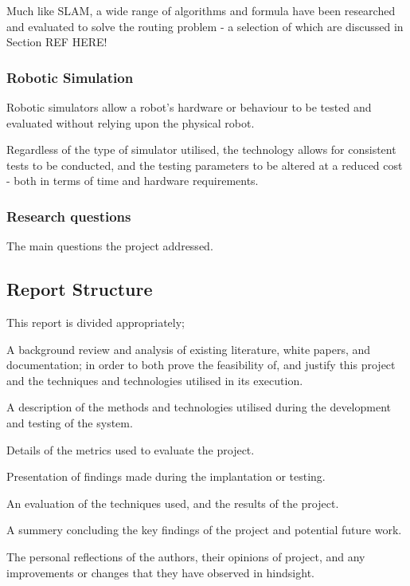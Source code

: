 Much like SLAM, a wide range of algorithms and formula have been researched
and evaluated to solve the routing problem - a selection of which are
discussed in Section REF HERE!


\subsubsection{Robotic Simulation}
Robotic simulators allow a robot's hardware or behaviour to be tested and
evaluated without relying upon the physical robot.

Regardless of the type of simulator utilised, the technology allows for
consistent tests to be conducted, and the testing parameters to be altered at
a reduced cost - both in terms of time and hardware requirements.


\subsubsection{Research questions}
The main questions the project addressed.


\subsection{Report Structure}
This report is divided appropriately;

A background review and analysis of existing literature, white papers, and
documentation; in order to both prove the feasibility of, and justify this
project and the techniques and technologies utilised in its execution.

A description of the methods and technologies utilised during the development
and testing of the system.

Details of the metrics used to evaluate the project.

Presentation of findings made during the implantation or testing.

An evaluation of the techniques used, and the results of the project.

A summery concluding the key findings of the project and potential future
work.

The personal reflections of the authors, their opinions of project, and any
improvements or changes that they have observed in hindsight.

